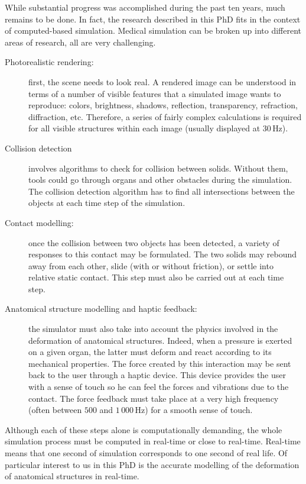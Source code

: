 While substantial progress was accomplished during the past ten years, much remains to be done. In fact, the research described in this PhD fits in the context of computed-based simulation. Medical simulation can be broken up into different areas of research, all are very challenging.
%
\begin{description}
\item[Photorealistic rendering:] first, the scene needs to look real. A rendered image can be understood in terms of a number of visible features that a simulated image wants to reproduce: colors, brightness, shadows, reflection, transparency, refraction, diffraction, etc. Therefore, a series of fairly complex calculations is required for all visible structures within each image (usually displayed at $30\,$Hz). 
\item[Collision detection] involves algorithms to check for collision between solids. Without them, tools could go through organs and other obstacles during the simulation. The collision detection algorithm has to find all intersections between the objects at each time step of the simulation. 
\item[Contact modelling:] once the collision between two objects has been detected, a variety of responses to this contact may be formulated. The two solids may rebound away from each other, slide (with or without friction), or settle into relative static contact. This step must also be carried out at each time step. 
\item[Anatomical structure modelling and haptic feedback:] the simulator must also take into account the physics involved in the deformation of anatomical structures. Indeed, when a pressure is exerted on a given organ, the latter must deform and react according to its mechanical properties. The force created by this interaction may be sent back to the user through a haptic device. This device provides the user with a sense of touch so he can feel the forces and vibrations due to the contact. The force feedback must take place at a very high frequency (often between $ 500 $ and $ 1\,000\,$Hz) for a smooth sense of touch. 
\end{description}
%
Although each of these steps alone is computationally demanding, the whole simulation process must be computed in real-time or close to real-time. Real-time means that one second of simulation corresponds to one second of real life. Of particular interest to us in this PhD is the accurate modelling of the deformation of anatomical structures in real-time. 

